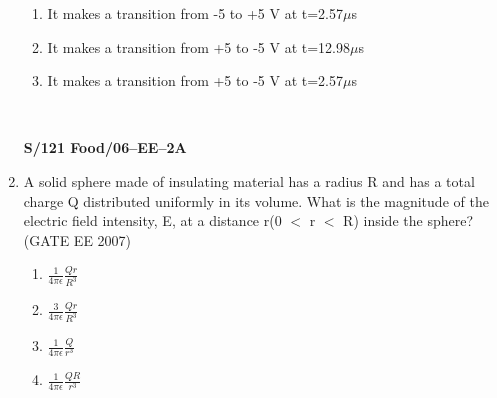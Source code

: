 \documentclass[a4paper,10pt]{exam}
\theoremstyle{remark}
\begin{document}
\begin{enumerate}
\begin{enumerate}
 \item  It makes a transition from -5 to +5 V at t=2.57$\mu$s
 \item  It makes a transition from +5 to -5 V at t=12.98$\mu$s
 \item  It makes a transition from +5 to -5 V at t=2.57$\mu$s
\end{enumerate}
\vfill
{}\\
\vspace{0.7cm}
\raggedright{\textbf{S/121 Food/06--EE--2A}}
\newpage
\item  A solid sphere made of insulating material has a radius R and has a total charge Q distributed uniformly in its volume. What is the magnitude of the electric field intensity, E, at a distance r(0 $<$ r $<$ R) inside the sphere?\hfill{(GATE EE 2007)} 
\begin{multicols}{4}
\begin{enumerate}
 \item $\frac{1}{4\pi\epsilon}$$\frac{Qr}{R^3}$
\item $\frac{3}{4\pi\epsilon}$$\frac{Qr}{R^3}$
\item $\frac{1}{4\pi\epsilon}$$\frac{Q}{r^3}$
\item $\frac{1}{4\pi\epsilon}$$\frac{QR}{r^3}$
\end{enumerate}
\end{multicols}


\end{enumerate}
\end{document}

